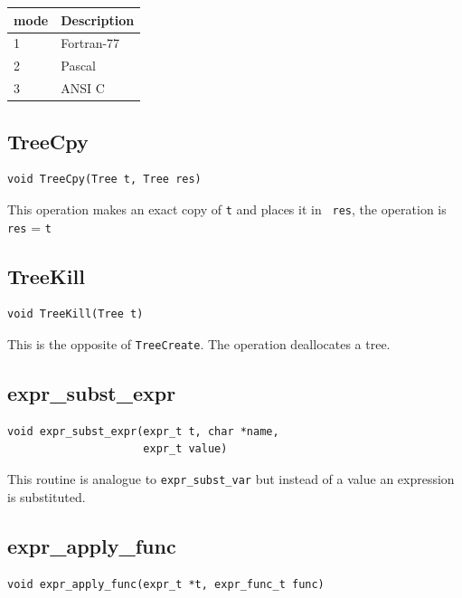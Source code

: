 \vspace{0.2cm}
\begin{center}
\begin{tabular}{ll}
\hline
  mode     & Description \\ \hline 
  1        & Fortran-77  \\  
  2        & Pascal      \\ 
  3        & ANSI C      \\
\hline
\end{tabular}
\end{center}
\vspace{0.2cm}

\subsection{TreeCpy}
\begin{verbatim}
void TreeCpy(Tree t, Tree res)
\end{verbatim}

This operation makes an exact copy of {\tt t} and places it in {\tt
  res}, \ie the operation is {\tt res} = {\tt t}

\subsection{TreeKill}
\begin{verbatim}
void TreeKill(Tree t)
\end{verbatim}

This is the opposite of {\tt TreeCreate}. The operation deallocates a
tree. 

\subsection{expr\_subst\_expr}
\begin{verbatim}
void expr_subst_expr(expr_t t, char *name,
                     expr_t value)
\end{verbatim}

This routine is analogue to {\tt expr\_subst\_var} but instead of a value
an expression is substituted.

\subsection{expr\_apply\_func}
\begin{verbatim}
void expr_apply_func(expr_t *t, expr_func_t func)
\end{verbatim}

